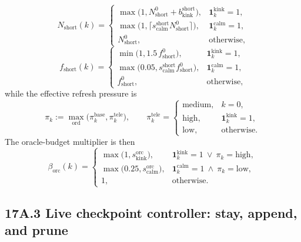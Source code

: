 \documentclass[11pt]{article}
\begin{document}
\[
N_{\mathrm{short}}(k)=
\begin{cases}
\max\!\bigl(1,N_{\mathrm{short}}^0+b_{\mathrm{kink}}^{\mathrm{short}}\bigr),&\mathbf 1_k^{\mathrm{kink}}=1,\\
\max\!\bigl(1,\lceil s_{\mathrm{calm}}^{\mathrm{short}}N_{\mathrm{short}}^0\rceil\bigr),&\mathbf 1_k^{\mathrm{calm}}=1,\\
N_{\mathrm{short}}^0,&\text{otherwise,}
\end{cases}
\]
\[
f_{\mathrm{short}}(k)=
\begin{cases}
\min\!\bigl(1,1.5\,f_{\mathrm{short}}^0\bigr),&\mathbf 1_k^{\mathrm{kink}}=1,\\
\max\!\bigl(0.05,s_{\mathrm{calm}}^{\mathrm{short}}f_{\mathrm{short}}^0\bigr),&\mathbf 1_k^{\mathrm{calm}}=1,\\
f_{\mathrm{short}}^0,&\text{otherwise,}
\end{cases}
\]
while the effective refresh pressure is
\[
\pi_k:=\max_{\mathrm{ord}}\!\bigl(\pi_k^{\mathrm{base}},\pi_k^{\mathrm{tele}}\bigr),
\qquad
\pi_k^{\mathrm{tele}}
=
\begin{cases}
\mathrm{medium},&k=0,\\
\mathrm{high},&\mathbf 1_k^{\mathrm{kink}}=1,\\
\mathrm{low},&\text{otherwise.}
\end{cases}
\]
The oracle-budget multiplier is then
\[
\beta_{\mathrm{orc}}(k)=
\begin{cases}
\max\!\bigl(1,s_{\mathrm{kink}}^{\mathrm{orc}}\bigr),&\mathbf 1_k^{\mathrm{kink}}=1\ \vee\ \pi_k=\mathrm{high},\\
\max\!\bigl(0.25,s_{\mathrm{calm}}^{\mathrm{orc}}\bigr),&\mathbf 1_k^{\mathrm{calm}}=1\ \wedge\ \pi_k=\mathrm{low},\\
1,&\text{otherwise.}
\end{cases}
\]

\subsection*{17A.3 Live checkpoint controller: stay, append, and prune}
\end{document}
